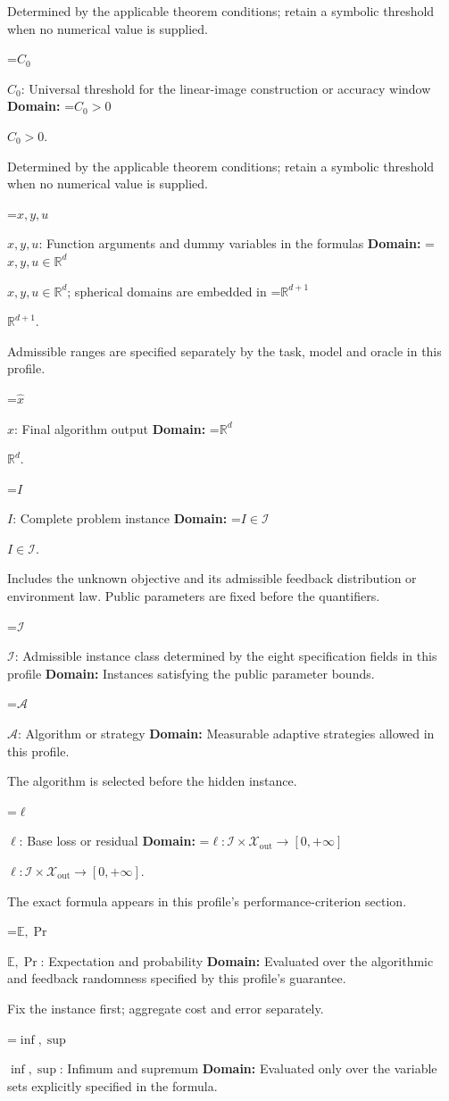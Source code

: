 \documentclass[10pt,a4paper]{article}
\newcommand{\AtlasMath}[1]{\par\begingroup\centering\setbox0=\hbox{$\displaystyle #1$}\ifdim\wd0>1.4\linewidth\typeout{ATLAS WIDE FORMULA: \the\wd0}\fi\ifdim\wd0>\linewidth\resizebox{\linewidth}{!}{\box0}\else\box0\fi\par\endgroup}
\newcommand{\AtlasInlineMath}[1]{\begingroup\setbox0=\hbox{$#1$}\ifdim\wd0>.4\linewidth\endgroup\AtlasMath{#1}\else\endgroup$#1$\fi}
\begin{document}
Determined by the applicable theorem conditions; retain a symbolic threshold when no numerical value is supplied.

\AtlasInlineMath{C_0}: Universal threshold for the linear-image construction or accuracy window \textbf{Domain:} \AtlasInlineMath{C_0>0}.

Determined by the applicable theorem conditions; retain a symbolic threshold when no numerical value is supplied.

\AtlasInlineMath{x,y,u}: Function arguments and dummy variables in the formulas \textbf{Domain:} \AtlasInlineMath{x,y,u\in\mathbb{R}^d}; spherical domains are embedded in \AtlasInlineMath{\mathbb{R}^{d+1}}.

Admissible ranges are specified separately by the task, model and oracle in this profile.

\AtlasInlineMath{\widehat{x}}: Final algorithm output \textbf{Domain:} \AtlasInlineMath{\mathbb{R}^d}.

\AtlasInlineMath{I}: Complete problem instance \textbf{Domain:} \AtlasInlineMath{I\in\mathcal{I}}.

Includes the unknown objective and its admissible feedback distribution or environment law. Public parameters are fixed before the quantifiers.

\AtlasInlineMath{\mathcal{I}}: Admissible instance class determined by the eight specification fields in this profile \textbf{Domain:} Instances satisfying the public parameter bounds.

\AtlasInlineMath{\mathcal{A}}: Algorithm or strategy \textbf{Domain:} Measurable adaptive strategies allowed in this profile.

The algorithm is selected before the hidden instance.

\AtlasInlineMath{\ell}: Base loss or residual \textbf{Domain:} \AtlasInlineMath{\ell:\mathcal{I}\times\mathcal{X}_{\mathrm{out}}\to[0,+\infty]}.

The exact formula appears in this profile's performance-criterion section.

\AtlasInlineMath{\mathbb{E},\Pr}: Expectation and probability \textbf{Domain:} Evaluated over the algorithmic and feedback randomness specified by this profile's guarantee.

Fix the instance first; aggregate cost and error separately.

\AtlasInlineMath{\inf,\sup}: Infimum and supremum \textbf{Domain:} Evaluated only over the variable sets explicitly specified in the formula.
\end{document}
